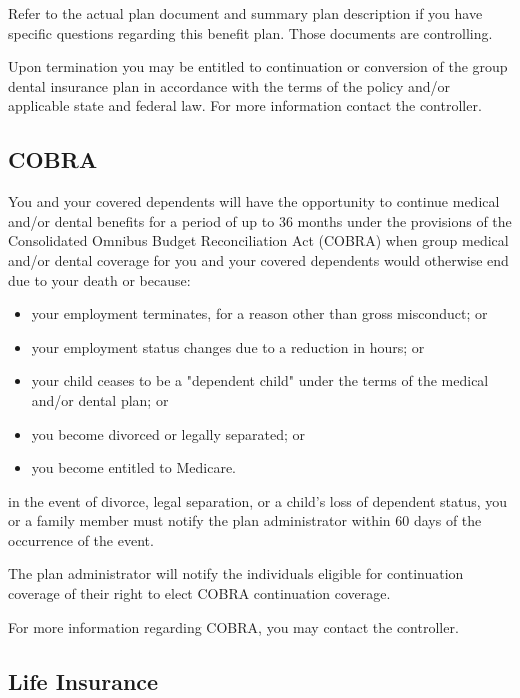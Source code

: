 Refer to the actual plan document and summary plan description if you have specific questions regarding this benefit plan. Those documents are controlling.

Upon termination you may be entitled to continuation or conversion of the group dental insurance plan in accordance with the terms of the policy and/or applicable state and federal law. For more information contact the controller.

\subsection{COBRA}

You and your covered dependents will have the opportunity to continue medical and/or dental benefits for a period of up to 36 months under the provisions of the Consolidated Omnibus Budget Reconciliation Act (COBRA) when group medical and/or dental coverage for you and your covered dependents would otherwise end due to your death or because:

\begin{itemize} 	\item your employment terminates, for a reason other 	than gross misconduct; or
	
	\item your employment status changes due to a 	reduction in hours; or
	
	\item your child ceases to be a "dependent child" 	under the terms of the medical and/or dental 	plan; or
	
	\item you become divorced or legally separated; or
	
	\item you become entitled to Medicare. \end{itemize}

in the event of divorce, legal separation, or a child's loss of dependent status, you or a family member must notify the plan administrator within 60 days of the occurrence of the event.

The plan administrator will notify the individuals eligible for continuation coverage of their right to elect COBRA continuation coverage.

For more information regarding COBRA, you may contact the controller.

\subsection{Life Insurance}

